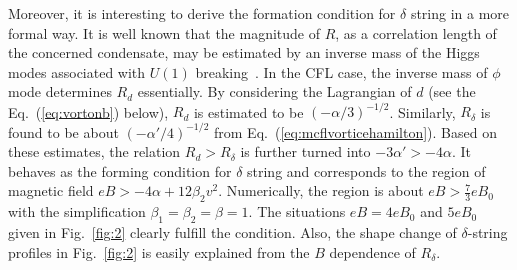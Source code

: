 \documentclass[prd, showpacs,nofootinbib,amsmath,amssymb]{revtex4}
\begin{document}
Moreover, it is interesting to derive the formation condition for $\delta$ string in a more formal way.
It is well known that the magnitude of $R$, as a correlation length of the concerned condensate, may be
estimated by an inverse mass of the Higgs modes associated with $U(1)$ breaking~\cite{vilenkin2000cosmic}.
In the CFL case, the inverse mass of $\phi$ mode determines $R_d$ essentially.
By considering the Lagrangian of $d$ (see the Eq.~(\ref{eq:vortonb}) below), $R_d$ is estimated to be
$(-\alpha/3)^{-1/2}$.
Similarly, $R_\delta$ is found to be about $(-\alpha'/4)^{-1/2}$ from Eq.~(\ref{eq:mcflvorticehamilton}).
Based on these estimates, the relation $R_d > R_\delta$ is further turned into
$- 3\alpha' > - 4\alpha$. It behaves as the forming condition for $\delta$ string and corresponds to the region of magnetic field 
$eB > - 4\alpha+12\beta_2 v^2$. Numerically, the region is about $eB > \frac{7}{3} eB_0$ with the simplification $\beta_1=\beta_2=\beta = 1$.
The situations $eB = 4eB_0 $ and $5eB_0$ given in Fig.~\ref{fig:2} clearly fulfill the condition.
Also, the shape change of $\delta$-string profiles in Fig.~\ref{fig:2} is easily explained 
from the $B$ dependence of $R_\delta$. 
\end{document}

